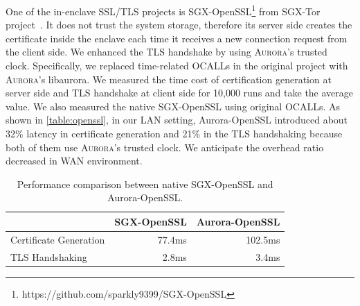 One of the in-enclave SSL/TLS projects is SGX-OpenSSL\footnote{https://github.com/sparkly9399/SGX-OpenSSL} from SGX-Tor project~\cite{DBLP:conf/nsdi/KimHHKH17}. It does not trust the system storage, therefore its server side creates the certificate inside the enclave each time it receives a new connection request from the client side. We enhanced the TLS handshake by using \textsc{Aurora}'s trusted clock. Specifically, we replaced time-related OCALLs in the original project with \textsc{Aurora}'s libaurora. %
We measured the time cost of certification generation at server side and TLS handshake at client side for 10,000 runs and take the average value. We also measured the native SGX-OpenSSL using original OCALLs. As shown in \autoref{table:openssl}, in our LAN setting, Aurora-OpenSSL introduced about 32\% latency in certificate generation and 21\% in the TLS handshaking because both of them use \textsc{Aurora}'s trusted clock. We anticipate the overhead ratio decreased in WAN environment.

\begin{table}[t]
	\centering
	\caption{Performance comparison between native SGX-OpenSSL and Aurora-OpenSSL.}
	\label{table:openssl}
	\small
	\begin{tabular}{lrr}
		\toprule
		& \textbf{SGX-OpenSSL} & \textbf{Aurora-OpenSSL} \\
		\midrule
		{Certificate Generation} & 77.4ms & 102.5ms \\
		{TLS Handshaking} & 2.8ms & 3.4ms \\
		\bottomrule
	\end{tabular}
\end{table}

